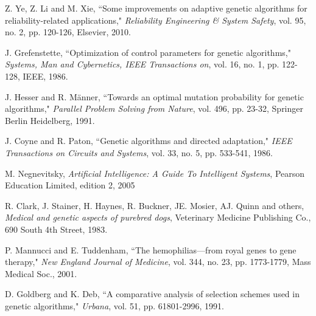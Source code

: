 \documentclass[conference]{IEEEtran}
\begin{document}
\begin{thebibliography}{17}
 Z. Ye, Z. Li and M. Xie, ``Some improvements on adaptive genetic algorithms for reliability-related applications,"
        {\it Reliability Engineering \& System Safety}, vol. 95, no. 2, pp. 120-126, Elsevier, 2010.

 J. Grefenstette, ``Optimization of control parameters for genetic algorithms,"
        {\it Systems, Man and Cybernetics, IEEE Transactions on}, vol. 16, no. 1, pp. 122-128, IEEE, 1986.

 J. Hesser and R. M{\"a}nner, ``Towards an optimal mutation probability for genetic algorithms,"
        {\it Parallel Problem Solving from Nature}, vol. 496, pp. 23-32, Springer Berlin Heidelberg, 1991.

 J. Coyne and R. Paton, ``Genetic algorithms and directed adaptation,"
        {\it IEEE Transactions on Circuits and Systems}, vol. 33, no. 5, pp. 533-541, 1986.

 M. Negnevitsky,
        {\it Artificial Intelligence: A Guide To Intelligent Systems}, Pearson Education Limited, edition 2, 2005


 R. Clark, J. Stainer, H. Haynes, R. Buckner, JE. Mosier, AJ. Quinn and others,
        {\it Medical and genetic aspects of purebred dogs}, Veterinary Medicine Publishing Co., 690 South 4th Street, 1983.


 P. Mannucci and E. Tuddenham, ``The hemophilias—from royal genes to gene therapy,"
        {\it New England Journal of Medicine}, vol. 344, no. 23, pp. 1773-1779, Mass Medical Soc., 2001.

 D. Goldberg and K. Deb, ``A comparative analysis of selection schemes used in genetic algorithms,"
        {\it Urbana}, vol. 51, pp. 61801-2996, 1991.

\end{thebibliography}

\end{document}
